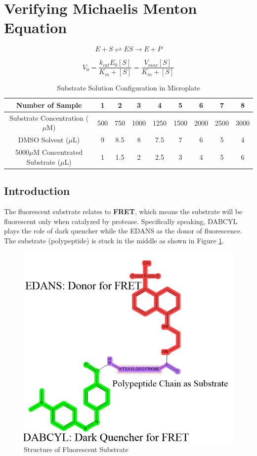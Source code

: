 \documentclass{report}
\begin{document}
\section{Verifying Michaelis Menton Equation}
$$
E + S \rightleftharpoons ES \rightarrow E+P
$$

$$
V_0 =\frac{k_{cat}E_0[S]}{K_m+[S]}=\frac{V_{max}[S]}{K_m+[S]}
$$
\begin{table}
    \centering
    \caption{Substrate Solution Configuration in Microplate}
    
    \begin{tabular}{|c|c|c|c|c|c|c|c|c|} \hline
        Number of Sample&1&2&3&4&5&6&7&8 \\ \hline
        Substrate Concentration ($\mu$M)&500&750&1000&1250&1500&2000&2500&3000 \\ \hline
        DMSO Solvent ($\mu$L)& 9&8.5&8&7.5&7&6&5&4\\ \hline
        5000$\mu$M Concentrated Substrate ($\mu$L)&1&1.5&2&2.5&3&4&5&6 \\ \hline
    \end{tabular}
    \label{Substrate Solution Configuration in Microplate}
\end{table}

\subsection{Introduction}
The fluorescent substrate relates to \textbf{FRET}, which means the substrate will be fluorescent only when catalyzed by protease.
Specifically speaking, DABCYL plays the role of dark quencher\cite{Quencher} while the EDANS\cite{EDANS} as the donor of fluorescence.
The substrate (polypeptide) is stuck in the middle as shown in Figure \ref{Structure of Fluorescent Substrate}.
\begin{figure}
    \centering
    \includegraphics[width=0.5\linewidth]{../Figures/fluorescent substrate.png}
    \caption{Structure of Fluorescent Substrate}
    \label{Structure of Fluorescent Substrate}
\end{figure}
\end{document}
